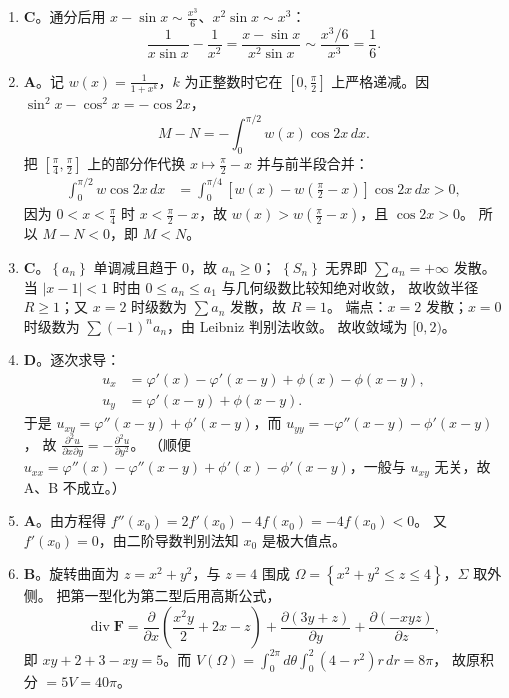 \begin{enumerate}
{\begin{enumerate}
	\item
	\textbf{C}。通分后用 $x-\sin x\sim\frac{x^3}{6}$、$x^2\sin x\sim x^3$：
	\[
	\frac{1}{x\sin x}-\frac{1}{x^2}=\frac{x-\sin x}{x^2\sin x}
	\sim\frac{x^3/6}{x^3}=\frac16 .
	\]

	\item
	\textbf{A}。记 $w(x)=\frac{1}{1+x^k}$，$k$ 为正整数时它在 $\left[0,\frac{\pi}{2}\right]$ 上严格递减。因
	$\sin^2x-\cos^2x=-\cos2x$，
	\[
	M-N=-\int_0^{\pi/2}w(x)\cos2x\,dx .
	\]
	把 $\left[\frac{\pi}{4},\frac{\pi}{2}\right]$ 上的部分作代换 $x\mapsto\frac{\pi}{2}-x$ 并与前半段合并：
	\begin{align*}
	\int_0^{\pi/2}\!\!w\cos2x\,dx
	&=\int_0^{\pi/4}\!\!\left[w(x)-w\!\left(\tfrac{\pi}{2}-x\right)\right]\cos2x\,dx>0,
	\end{align*}
	因为 $0<x<\frac{\pi}{4}$ 时 $x<\frac{\pi}{2}-x$，故 $w(x)>w\left(\frac{\pi}{2}-x\right)$，且 $\cos2x>0$。
	所以 $M-N<0$，即 $M<N$。

	\item
	\textbf{C}。$\left\{a_n\right\}$ 单调减且趋于 $0$，故 $a_n\geqslant0$；
	$\left\{S_n\right\}$ 无界即 $\sum a_n=+\infty$ 发散。
	当 $|x-1|<1$ 时由 $0\leqslant a_n\leqslant a_1$ 与几何级数比较知绝对收敛，
	故收敛半径 $R\geqslant1$；又 $x=2$ 时级数为 $\sum a_n$ 发散，故 $R=1$。
	端点：$x=2$ 发散；$x=0$ 时级数为 $\sum(-1)^na_n$，由 Leibniz 判别法收敛。
	故收敛域为 $[0,2)$。

	\item
	\textbf{D}。逐次求导：
	\begin{align*}
	u_x&=\varphi'(x)-\varphi'(x-y)+\phi(x)-\phi(x-y),\\
	u_y&=\varphi'(x-y)+\phi(x-y).
	\end{align*}
	于是
	$u_{xy}=\varphi''(x-y)+\phi'(x-y)$，而
	$u_{yy}=-\varphi''(x-y)-\phi'(x-y)$，
	故 $\frac{\partial^2u}{\partial x\partial y}=-\frac{\partial^2u}{\partial y^2}$。
	（顺便 $u_{xx}=\varphi''(x)-\varphi''(x-y)+\phi'(x)-\phi'(x-y)$，一般与 $u_{xy}$ 无关，故 A、B 不成立。）

	\item
	\textbf{A}。由方程得 $f''\left(x_0\right)=2f'\left(x_0\right)-4f\left(x_0\right)=-4f\left(x_0\right)<0$。
	又 $f'\left(x_0\right)=0$，由二阶导数判别法知 $x_0$ 是极大值点。

	\item
	\textbf{B}。旋转曲面为 $z=x^2+y^2$，与 $z=4$ 围成
	$\Omega=\left\{x^2+y^2\leqslant z\leqslant4\right\}$，$\Sigma$ 取外侧。
	把第一型化为第二型后用高斯公式，
	\[
	\operatorname{div}\bm{F}=\frac{\partial}{\partial x}\!\left(\frac{x^2y}{2}+2x-z\right)
	+\frac{\partial(3y+z)}{\partial y}+\frac{\partial(-xyz)}{\partial z},
	\]
	即 $xy+2+3-xy=5$。而
	$V(\Omega)=\int_0^{2\pi}\!\!d\theta\int_0^2\left(4-r^2\right)r\,dr=8\pi$，
	故原积分 $=5V=40\pi$。


\end{enumerate}}
\end{enumerate}
